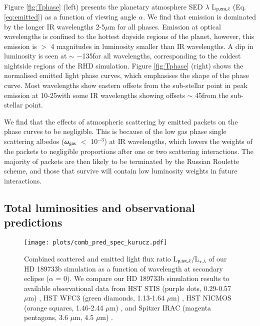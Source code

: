 \documentclass{aa}
\begin{document}
Figure \ref{fig:Tphase} (left) presents the planetary atmosphere SED $\lambda$ L$_{\rm p, em, \lambda}$ (Eq. \ref{eq:emitted}) as a function of viewing angle $\alpha$.
We find that emission is dominated by the longer IR wavelengths 2-5$\mu$m for all phases.
Emission at optical wavelengths is confined to the hottest dayside regions of the planet, however, this emission is $>$ 4 magnitudes in luminosity smaller than IR wavelengths.
A dip in luminosity is seen at $\sim$ $-$135\degr for all wavelengths, corresponding to the coldest nightside regions of the RHD simulation.
Figure \ref{fig:Tphase} (right) shows the normalised emitted light phase curves, which emphasises the shape of the phase curve.
Most wavelengths show eastern offsets from the sub-stellar point in peak emission at 10-25\degr with some IR wavelengths showing offsets $\sim$ 45\degr from the sub-stellar point.

We find that the effects of atmospheric scattering by emitted packets on the phase curves to be negligible.
This is because of the low gas phase single scattering albedos ($\omega_{\rm gas}$ $<$ 10$^{-3}$) at IR wavelengths, which lowers the weights of the packets to negligible proportions after one or two scattering interactions.
The majority of packets are then likely to be terminated by the Russian Roulette scheme, and those that survive will contain low luminosity weights in future interactions.

\subsection{Total luminosities and observational predictions}
\label{sec:res_combine}

\begin{figure*}
   \centering
   \texttt{[image: plots/comb\_pred\_spec\_kurucz.pdf]} 
   \caption{Combined scattered and emitted light flux ratio L$_{\rm p,tot,\lambda}$/L$_{\star.\lambda}$ of our HD 189733b simulation as a function of wavelength at secondary eclipse ($\alpha$ = 0\degr).
   We compare our HD 189733b simulation results to available observational data from HST STIS (purple dots, 0.29-0.57 $\mu$m) \citep{Evans2013}, HST WFC3 (green diamonds, 1.13-1.64 $\mu$m) \citep{Crouzet2014}, HST NICMOS (orange squares, 1.46-2.44 $\mu$m) \citep{Swain2009, Barstow2014}, and Spitzer IRAC (magenta pentagons, 3.6 $\mu$m, 4.5 $\mu$m) \citep{Knutson2012}. }
   \label{fig:comb_phase_ratio}
\end{figure*}
\end{document}
